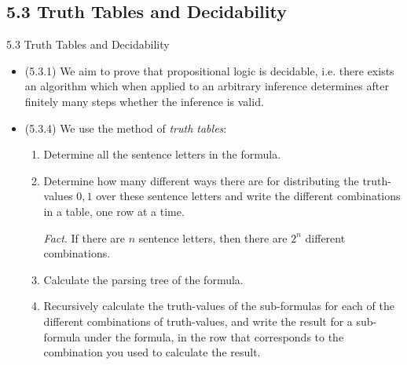 \documentclass[../slides.tex]{subfiles}
\begin{document}
\subsection{5.3 Truth Tables and Decidability}
\begin{frame}{5.3 Truth Tables and Decidability}

	\begin{itemize}
	
		\item (5.3.1) We aim to prove that propositional logic is decidable, i.e. there exists an algorithm which when applied to an arbitrary inference determines after finitely many steps whether the inference is valid.
		
		\item (5.3.4) We use the method of \emph{truth tables}:
		
		\begin{enumerate}[1.]
		
			\item Determine all the sentence letters in the formula.
			
			\item Determine how many different ways there are for distributing the truth-values $0,1$ over these sentence letters and write the different combinations in a table, one row at a time. 
			
			\emph{Fact}. If there are $n$ sentence letters, then there are $2^n$ different combinations. 
			
			\item Calculate the parsing tree of the formula.
			
			\item Recursively calculate the truth-values of the sub-formulas for each of the different combinations of truth-values, and write the result for a sub-formula under the formula, in the row that corresponds to the combination you used to calculate the result. 
		\end{enumerate}
	
	\end{itemize}


\end{frame}
\end{document}
